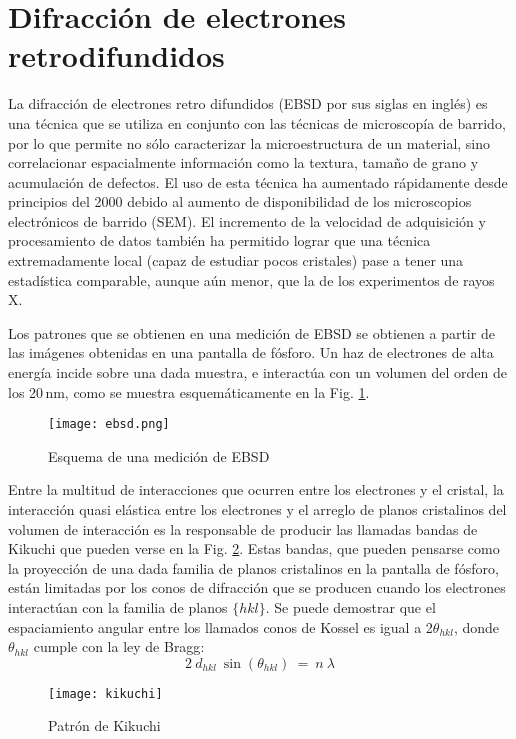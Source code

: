  \section{Difracción de electrones retrodifundidos}\label{S:EBSD}
La difracción de electrones retro difundidos (EBSD por sus siglas en inglés) es una técnica que se utiliza en conjunto con las técnicas de microscopía de barrido, por lo que permite no sólo caracterizar la microestructura de un material, sino correlacionar espacialmente información como la textura, tamaño de grano y acumulación de defectos.
El uso de esta técnica ha aumentado rápidamente desde principios del 2000 debido al aumento de disponibilidad de los microscopios electrónicos de barrido (SEM). El incremento de la velocidad de adquisición y procesamiento de datos también ha permitido lograr que una técnica extremadamente local (capaz de estudiar pocos cristales) pase a tener una estadística comparable, aunque aún menor, que la de los experimentos de rayos X.

Los patrones que se obtienen en una medición de EBSD se obtienen a partir de las imágenes obtenidas en una pantalla de fósforo. Un haz de electrones de alta energía incide sobre una dada muestra, e interactúa con un volumen del orden de los 20\,nm, como se muestra esquemáticamente en la Fig. \ref{fig:ebsd}.

\begin{figure}[!htb]
  \centering
  \texttt{[image: ebsd.png]}
  \caption{Esquema de una medición de EBSD}
  \label{fig:ebsd}
\end{figure}

Entre la multitud de interacciones que ocurren entre los electrones y el cristal, la interacción quasi elástica entre los electrones y el arreglo de planos cristalinos del volumen de interacción es la responsable de producir las llamadas bandas de Kikuchi que pueden verse en la Fig. \ref{fig:kikuchi}.
Estas bandas, que pueden pensarse como la proyección de una dada familia de planos cristalinos en la pantalla de fósforo, están limitadas por los conos de difracción que se producen cuando los electrones interactúan con la familia de planos $\{ hkl \}$. 
Se puede demostrar que el espaciamiento angular entre los llamados conos de Kossel es igual a 2$\theta_{hkl}$, donde $\theta_{hkl}$ cumple con la ley de Bragg\cite{schwartz2010electron}:
\begin{equation}
  2 \ d_{hkl} \ \sin(\theta_{hkl}) \ = \ n \ \lambda
  \label{eq:BraggEBSD}
\end{equation}
\noindent
\begin{figure}[!htb]
  \centering
  \texttt{[image: kikuchi]}
  \caption{Patrón de Kikuchi}
  \label{fig:kikuchi}
 \end{figure}

